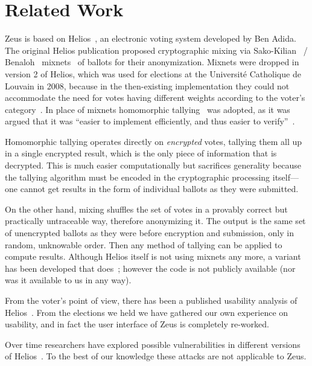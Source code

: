 \documentclass[letterpaper,10pt]{article}
\begin{document}
\section{Related Work}
\label{sec:related}

Zeus is based on Helios~\cite{adida:2008}, an electronic voting system
developed by Ben Adida. The original Helios publication
\cite{adida:2008} proposed cryptographic mixing via
Sako-Kilian~\cite{sako:1995} / Benaloh~\cite{benaloh:2006}
mixnets~\cite{sako:1995} of ballots for their anonymization. Mixnets
were dropped in version 2 of Helios, which was used for elections at
the Universit\'{e} Catholique de Louvain in 2008, because in the
then-existing implementation they could not accommodate the need for
votes having different weights according to the voter's
category~\cite{adida:2009}. In place of mixnets homomorphic
tallying~\cite{cohen:1985} was adopted, as it was argued that it was
``easier to implement efficiently, and thus easier to
verify''~\cite{adida:2009}.

Homomorphic tallying operates directly on \emph{encrypted} votes,
tallying them all up in a single encrypted result, which is the only
piece of information that is decrypted. This is much easier
computationally but sacrifices generality because the tallying
algorithm must be encoded in the cryptographic processing itself---one
cannot get results in the form of individual ballots as they were
submitted.

On the other hand, mixing shuffles the set of votes in a provably
correct but practically untraceable way, therefore anonymizing it. The
output is the same set of unencrypted ballots as they were before
encryption and submission, only in random, unknowable order. Then any
method of tallying can be applied to compute results. Although Helios
itself is not using mixnets any more, a variant has been developed
that does~\cite{bulens:2011}; however the code is not publicly
available (nor was it available to us in any way).

From the voter's point of view, there has been a published usability
analysis of Helios~\cite{karayumak:2011}. From the
elections we held we have gathered our own experience on usability,
and in fact the user interface of Zeus is completely re-worked.

Over time researchers have explored possible vulnerabilities in
different versions of Helios~\cite{estehghari:2010,heiderich:2011}. To
the best of our knowledge these attacks are not applicable to Zeus.
\end{document}
